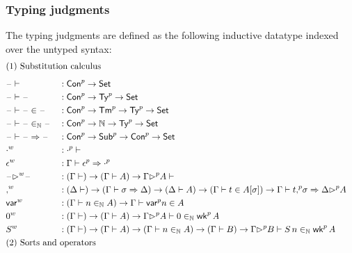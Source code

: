 


  \subsubsection{Typing judgments}
  \label{sec:typing_judgments}
  The typing judgments are defined as the following inductive datatype indexed over the
  untyped syntax:
\begin{alignat*}{5}
  & \rlap{(1) Substitution calculus} \\[0.5em]
  & \blank \vdash && : \Conu\ra \Set \\
  & \blank \vdash \blank  && : \Conu\ra \Tyu\ra\Set \\
  & \blank \vdash \blank \in \blank  && : \Conu\ra \Tmu\ra \Tyu\ra \Set \\
  & \blank \vdash \blank \invar \blank  && : \Conu\ra \N \ra \Tyu\ra \Set \\
  & \blank \vdash \blank \Rightarrow \blank  && : \Conu\ra \Subu \ra \Conu\ra \Set \\
  & \emptyw && : \emptyu \vdash \\
  & \epsilonw && : \Gamma\vdash \epsilonu \Rightarrow \emptyu \\
  & \blank\extw\blank && : ( \Gamma\vdash )  \ra  (\Gamma\vdash A)  \ra
  \Gamma\extu A \vdash \\
  & \consw && :
    (\Delta \vdash) \ra
    (\Gamma\vdash \sigma \Rightarrow\Delta)\ra
    ( \Delta \vdash A) \ra
    ( \Gamma \vdash t \in A[\sigma]) \ra
    \Gamma \vdash t \consu \sigma \Rightarrow \Delta\extu A
   \\
  & \varw  && : (\Gamma \vdash n \invar A) \ra \Gamma \vdash \varu n \in A \\
  & \vzw  && : (\Gamma\vdash)\ra(\Gamma\vdash A)\ra\Gamma \extu  A \vdash 0 \invar \wku \, A \\
  & \vsw  && : (\Gamma\vdash)\ra(\Gamma\vdash A)\ra(\Gamma \vdash n \invar A) \ra (\Gamma \vdash B) \ra \Gamma \extu  B
  \vdash S\,n \invar \wku \, A \\
  & \rlap{(2) Sorts and operators} \\[0.5em]

\end{alignat*}

